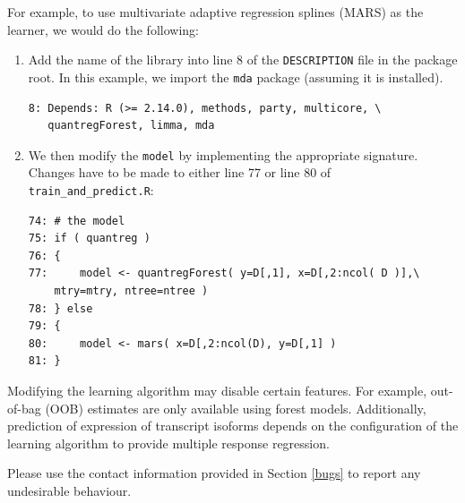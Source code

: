 \documentclass[a4paper,12pt]{article}
\begin{document}
For example, to use multivariate adaptive regression splines (MARS) as the learner, we would do the following:

\begin{enumerate}
\item Add the name of the library into line 8 of the \texttt{DESCRIPTION} file in the package root. In this example, we import the \texttt{mda} package (assuming it is installed).

\begin{verbatim}
8: Depends: R (>= 2.14.0), methods, party, multicore, \
   quantregForest, limma, mda
\end{verbatim}

\item We then modify the \texttt{model} by implementing the appropriate signature. Changes have to be made to either line 77 or line 80 of \texttt{train\_and\_predict.R}:

\begin{verbatim}
74: # the model
75: if ( quantreg )
76: {
77: 	model <- quantregForest( y=D[,1], x=D[,2:ncol( D )],\
    mtry=mtry, ntree=ntree )
78: } else
79: {
80: 	model <- mars( x=D[,2:ncol(D), y=D[,1] )
81: }	
\end{verbatim}
\end{enumerate}

Modifying the learning algorithm may disable certain features. For example, out-of-bag (OOB) estimates are only available using forest models. Additionally, prediction of expression of transcript isoforms depends on the configuration of the learning algorithm to provide multiple response regression.

Please use the contact information provided in Section \ref{bugs} to report any undesirable behaviour.
\end{document}
